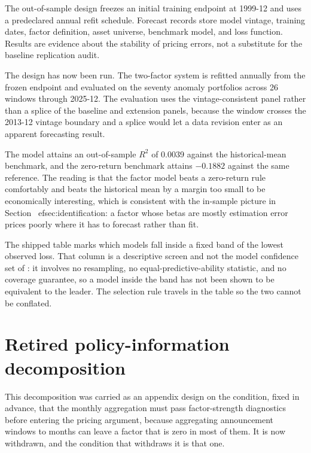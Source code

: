 \documentclass[11pt]{article}
\begin{document}
The out-of-sample design freezes an initial training endpoint at 1999-12 and uses a predeclared annual refit schedule. %
Forecast records store model vintage, training dates, factor definition, asset
universe, benchmark model, and loss function. Results are evidence about the
stability of pricing errors, not a substitute for the baseline replication audit.

The design has now been run. The two-factor system is refitted annually from the
frozen endpoint and evaluated on the seventy anomaly portfolios across 26 windows %
through 2025-12. The evaluation uses the vintage-consistent panel rather than a %
splice of the baseline and extension panels, because the window crosses the
2013-12 vintage boundary and a splice would let a data revision enter as an %
apparent forecasting result.

The model attains an out-of-sample $R^2$ of 0.0039 against the historical-mean %
benchmark, and the zero-return benchmark attains $-0.1882$ against the same %
reference. The reading is that the factor model beats a zero-return rule
comfortably and beats the historical mean by a margin too small to be
economically interesting, which is consistent with the in-sample picture in
Section~
ef{sec:identification}: a factor whose betas are mostly estimation
error prices poorly where it has to forecast rather than fit.

The shipped table marks which models fall inside a fixed band of the lowest
observed loss. That column is a descriptive screen and not the model confidence
set of \citet{hansen2011model}: it involves no resampling, no
equal-predictive-ability statistic, and no coverage guarantee, so a model inside
the band has not been shown to be equivalent to the leader. The selection rule
travels in the table so the two cannot be conflated. %

\section{Retired policy-information decomposition}
\label{sec:decomposition}

This decomposition was carried as an appendix design on the condition, fixed in
advance, that the monthly aggregation must pass factor-strength diagnostics
before entering the pricing argument, because aggregating announcement windows
to months can leave a factor that is zero in most of them. It is now withdrawn,
and the condition that withdraws it is that one.
\end{document}
